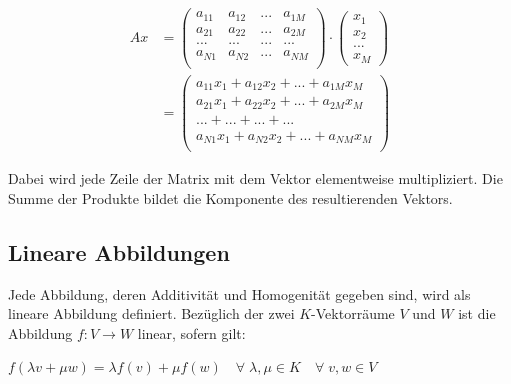\documentclass[]{dsadokumentation}
\begin{document}
\begin{equation}
  \begin{aligned}
    Ax &= \begin{pmatrix}
      a_{11} & a_{12} & ... & a_{1M} \\ 
      a_{21} & a_{22} & ... & a_{2M} \\ 
      ... & ... & ... & ... \\ 
      a_{N1} & a_{N2} & ... & a_{NM} \\ 
    \end{pmatrix}
    \cdot 
    \begin{pmatrix}
      x_1 \\ x_2 \\ ... \\ x_M
    \end{pmatrix} \\[2ex]
    &=  \begin{pmatrix}
      a_{11}x_1 + a_{12}x_2 +... + a_{1M}x_M \\ 
      a_{21}x_1 + a_{22}x_2 + ... + a_{2M}x_M \\ 
      ... + ... + ... + ... \\ 
      a_{N1}x_1 + a_{N2}x_2 + ... + a_{NM}x_M \\ 
    \end{pmatrix}
  \end{aligned}
\end{equation}

Dabei wird jede Zeile der Matrix mit dem Vektor elementweise multipliziert. Die Summe der Produkte bildet die Komponente des resultierenden Vektors.  

\subsection{Lineare Abbildungen}
Jede Abbildung, deren Additivität und Homogenität gegeben sind, wird als lineare Abbildung definiert. Bezüglich der zwei $K$-Vektorräume $V$ und $W$ ist die Abbildung $f: V \rightarrow W$ linear, sofern gilt:
\begin{center} $f(\lambda v + \mu w)=\lambda f(v) + \mu f(w) \quad \forall \; \lambda, \mu \in K \quad \forall \; v, w \in V$ \end{center}
\end{document}
